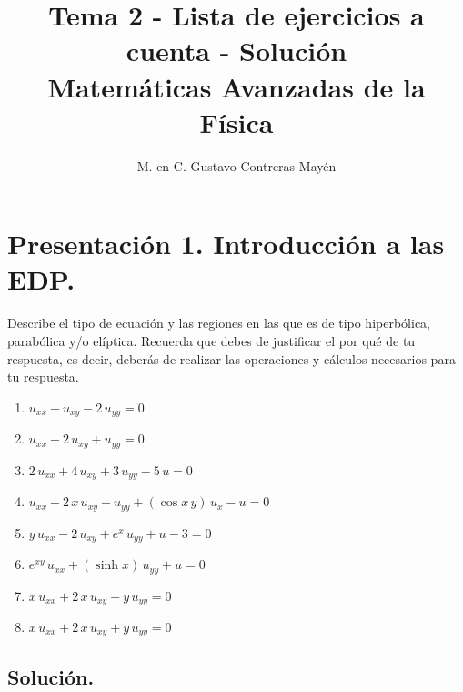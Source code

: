 
\title{Tema 2 - Lista de ejercicios a cuenta - Solución\\ \large{Matemáticas Avanzadas de la Física}\vspace{-3ex}}
\author{M. en C. Gustavo Contreras Mayén}
\date{ }

\vspace{-4cm}
\maketitle
\fontsize{14}{14}\selectfont

\section{Presentación 1. Introducción a las EDP.}

Describe el tipo de ecuación y las regiones en las que es de tipo hiperbólica, parabólica y/o elíptica. Recuerda que debes de justificar el por qué de tu respuesta, es decir, deberás de realizar las operaciones y cálculos necesarios para tu respuesta.

\begin{enumerate}[label=\alph*)]
\item \Large{$u_{xx} - u_{xy} - 2 \, u_{yy} = 0$}
\item \Large{$u_{xx} + 2 \, u_{xy} + u_{yy} = 0$}
\item \Large{$2 \, u_{xx} + 4 \, u_{xy} + 3 \, u_{yy} - 5 \, u = 0$}
\item \Large{$u_{xx} + 2 \, x \, u_{xy} + u_{yy} + (\cos x \, y) \, u_{x} - u = 0$}
\item \Large{$y \, u_{xx} - 2 \, u_{xy} + e^{x} \, u_{yy} + u - 3 = 0$}
\item \Large{$e^{x y} \, u_{xx} + (\sinh x) \, u_{yy} + u = 0$}
\item \Large{$x \, u_{xx} + 2 \, x \, u_{xy} - y \, u_{yy} = 0$}
\item \Large{$x \, u_{xx} + 2 \, x \, u_{xy} + y \, u_{yy} = 0$}
\end{enumerate}

\subsection{Solución.}


